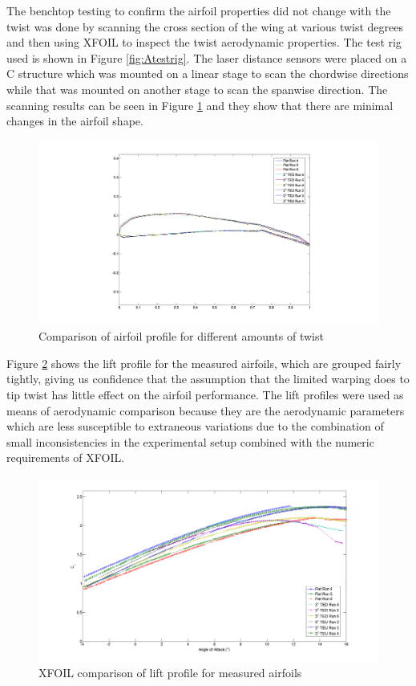 \documentclass[11pt]{ucthesis}
\begin{document}
The benchtop testing to confirm the airfoil properties did not change with the twist was done by scanning the cross section of the wing at various twist degrees and then using XFOIL to inspect the twist aerodynamic properties. The test rig used is shown in Figure \ref{fig:Atestrig}. The laser distance sensors were placed on a C structure which was mounted on a linear stage to scan the chordwise directions while that was mounted on another stage to scan the spanwise direction. The scanning results can be seen in Figure \ref{fig:Ascan} and they show that there are minimal changes in the airfoil shape.

\begin{figure}[h]
\centering
\includegraphics[width=0.75\linewidth]{Figures/AirfoilDirectMeasurements.png}
\caption{Comparison of airfoil profile for different amounts of twist}
\label{fig:Ascan}
\end{figure}

Figure \ref{fig:Alift} shows the lift profile for the measured airfoils, which are grouped fairly tightly, giving us confidence that the assumption that the limited warping does to tip twist has little effect on the airfoil performance. The lift profiles were used as means of aerodynamic comparison because they are the aerodynamic parameters which are less susceptible to extraneous variations due to the combination of small inconsistencies in the experimental setup combined with the numeric requirements of XFOIL. \cite{drela1989xfoil}

\begin{figure}[thpb]
\centering
\includegraphics[width=0.75\linewidth]{Figures/CLDirectMeasurements.png}
\caption{XFOIL comparison of lift profile for measured airfoils}
\label{fig:Alift}
\end{figure}
\end{document}
